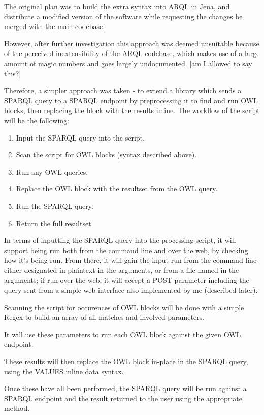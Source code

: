 \documentclass{article}
\begin{document}
The original plan was to build the extra syntax into ARQL in Jena, and
distribute a modified version of the software while requesting the changes be
merged with the main codebase.

However, after further investigation this approach was deemed unsuitable because
of the perceived inextensibility of the ARQL codebase, which makes use of a
large amount of magic numbers and goes largely undocumented. [am I allowed to
say this?]

Therefore, a simpler approach was taken - to extend a library which sends a
SPARQL query to a SPARQL endpoint by preprocessing it to find and run OWL
blocks, then replacing the block with the results inline. The workflow of the
script will be the following:

\begin{enumerate}
    \item Input the SPARQL query into the script.
    \item Scan the script for OWL blocks (syntax described above).
    \item Run any OWL queries.
    \item Replace the OWL block with the resultset from the OWL query.
    \item Run the SPARQL query.
    \item Return the full resultset.
\end{enumerate}

In terms of inputting the SPARQL query into the processing script, it will
support being run both from the command line and over the web, by checking how
it's being run. From there, it will gain the input run from the command line
either designated in plaintext in the arguments, or from a file named in the
arguments; if run over the web, it will accept a POST parameter including the
query sent from a simple web interface also implemented by me (described later).

Scanning the script for occurences of OWL blocks will be done with a simple
Regex to build an array of all matches and involved parameters.

It will use these parameters to run each OWL block against the given OWL 
endpoint.

These results will then replace the OWL block in-place in the SPARQL query,
using the VALUES inline data syntax.

Once these have all been performed, the SPARQL query will be run against a
SPARQL endpoint and the result returned to the user using the appropriate method.
\end{document}
